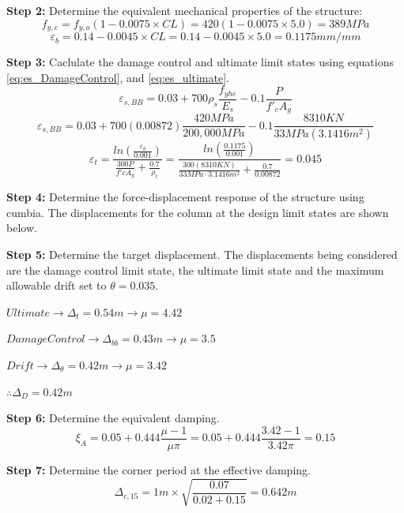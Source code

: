 \textbf{Step 2:} Determine the equivalent mechanical properties of the structure:
\begin{displaymath}
    f_{y,e}=f_{y,o}(1-0.0075\times CL)=420(1-0.0075\times 5.0)=389 MPa
\end{displaymath}
\begin{displaymath}
    \varepsilon_{b}=0.14-0.0045 \times CL = 0.14-0.0045 \times 5.0 = 0.1175 mm/mm
\end{displaymath}

\textbf{Step 3:} Caclulate the damage control and ultimate limit states using equations \ref{eq:es_DamageControl}, and \ref{eq:es_ultimate}.
\begin{displaymath}
    \varepsilon_{s,BB}=0.03+700\rho_{s}  \frac{f_{yhe}}{E_{s}} -0.1\frac{P}{f'_{c}A_{g}}
\end{displaymath}
\begin{displaymath}
    \varepsilon_{s,BB}=0.03+700 (0.00872)  \frac{420 MPa}{200,000 MPa} -0.1\frac{8310 KN}{33MPa (3.1416 m^2)}
\end{displaymath}
\begin{displaymath}
    \varepsilon_{t}=\frac{ln(\frac{\varepsilon_{b}}{0.001})}{\frac{300P}{f'c A_{g}}+\frac{0.7}{\rho_{t}}}=\frac{ln(\frac{0.1175}{0.001})}{\frac{300(8310KN)}{33MPa \cdot 3.1416 m^2}+\frac{0.7}{0.00872}}=0.045
\end{displaymath}

\textbf{Step 4:} Determine the force-displacement response of the structure using cumbia. The displacements for the column at the design limit states are shown below. 


\textbf{Step 5:} Determine the target displacement. The displacements being considered are the damage control limit state, the ultimate limit state and the maximum allowable drift set to $\theta=0.035$.

$Ultimate \to \Delta_{t}=0.54 m \to \mu=4.42$

$Damage Control \to \Delta_{bb} =0.43 m \to \mu=3.5$

$Drift \to \Delta_{\theta}=0.42 m \to \mu=3.42$

$\therefore \Delta_{D}=0.42m$

\textbf{Step 6:} Determine the equivalent damping.
\begin{displaymath}
    \xi_{A}=0.05+0.444\frac{\mu-1}{\mu\pi}=0.05+0.444\frac{3.42-1}{3.42\pi}=0.15
\end{displaymath}

\textbf{Step 7:} Determine the corner period at the effective damping.
\begin{displaymath}
    \Delta_{c,15}=1 m \times \sqrt{\frac{0.07}{0.02+0.15}} = 0.642 m
\end{displaymath}

